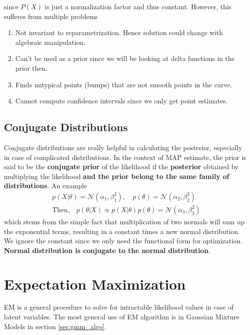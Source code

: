 \documentclass[../statistical_learning_notes.tex]{subfiles}
\begin{document}
since $P(X)$ is just a normalization factor and thus constant. However, this sufferes from multiple problems
\begin{enumerate}
    \item Not invariant to reparametrization. Hence solution could change with algebraic manipulation.
    \item Can't be used as a prior since we will be looking at delta functions in the prior then.
    \item Finds untypical points (bumps) that are not smooth points in the curve.
    \item Cannot compute confidence intervals since we only get point estimates.
\end{enumerate}


\subsection{Conjugate Distributions}
Conjugate distributions are really helpful in calculating the posterior, especially in case of complicated distributions. In the context of MAP estimate, the prior is said to be the \textbf{conjugate prior} of the likelihood if the \textbf{posterior} obtained by multiplying the likelihood \textbf{and the prior belong to the same family of distributions}. An example
\begin{gather*}
    p(X|\theta) = \mathcal{N}(\alpha_{1}, \beta_{1}^{2}), \quad p(\theta) = \mathcal{N}(\alpha_{2}, \beta_{2}^{2})\\
    \text{Then,} \quad p(\theta|X) \propto p(X|\theta)p(\theta) = \mathcal{N}(\alpha_{3}, \beta_{3}^{2})
\end{gather*}
which stems from the simple fact that multiplication of two normals will sum up the exponential terms, resulting in a constant times a new normal distribution. We ignore the constant since we only need the functional form for optimization.\newline
\textbf{Normal distribution is conjugate to the normal distribution}.


\section{Expectation Maximization}
EM is a general procedure to solve for intractable likelihood values in case of latent variables. The most general use of EM algorithm is in Gaussian Mixture Models in section \ref{sec:gmm_algo}.
\end{document}
